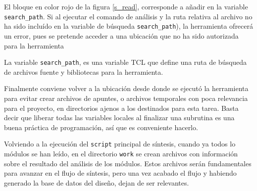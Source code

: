 
El bloque en color rojo de la figura \ref{s_read}, corresponde a añadir en la variable \texttt{search\_path}. Si al ejecutar el comando de análisis y la ruta relativa al archivo no ha sido incluído en la variable de búsqueda \texttt{search\_path}), la herramienta ofrecerá un error, pues se pretende acceder a una ubicación que no ha sido autorizada para la herramienta

La variable \texttt{search\_path}, es una variable TCL que define una ruta de búsqueda de archivos fuente y bibliotecas para la herramienta.%

%
%
%

Finalmente conviene volver a la ubicación desde donde se ejecutó la herramienta para evitar crear archivos de apuntes, o archivos temporales con poca relevancia para el proyecto, en directorios ajenos a los destinados para esta tarea. Basta decir que liberar todas las variables locales al finalizar una subrutina es una buena práctica de programación, así que es conveniente hacerlo.

Volviendo a la ejecución del \texttt{script} principal de síntesis, cuando ya todos lo módulos se han leído, en el directorio \texttt{work} se crean archivos con información sobre el resultado del análisis de los módulos. Estos archivos serán fundamentales para avanzar en el flujo de síntesis, pero una vez acabado el flujo y habiendo generado la base de datos del diseño, dejan de ser relevantes.


